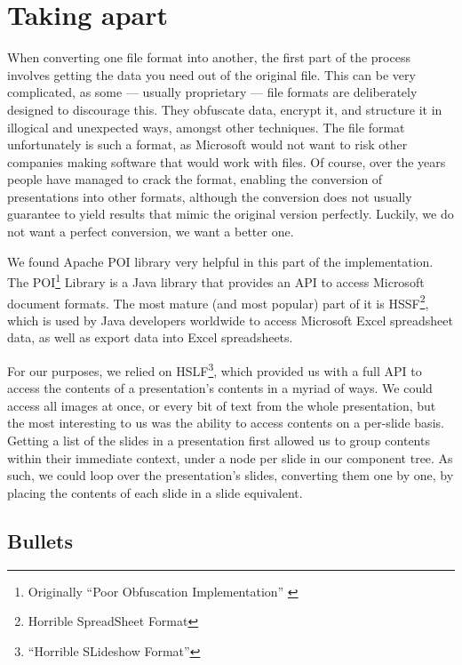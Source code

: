   \section{Taking \ppt apart}
   \label{poi}

   When converting one file format into another, the first part of the process
   involves getting the data you need out of the original file. This can be
   very complicated, as some --- usually proprietary --- file formats are
   deliberately designed to discourage this. They obfuscate data, encrypt it,
   and structure it in illogical and unexpected ways, amongst other techniques.
   The \ppt file format unfortunately is such a format, as Microsoft would not
   want to risk other companies making software that would work with \ppt
   files. Of course, over the years people have managed to crack the format,
   enabling the conversion of \ppt presentations into other formats, although
   the conversion does not usually guarantee to yield results that mimic the
   original version perfectly. Luckily, we do not want a perfect conversion, we
   want a better one.

   We found Apache POI library very helpful in this part of the implementation.
   The POI\footnote{Originally ``Poor Obfuscation Implementation''
   \citep{sundaram-1}} Library is a Java library that provides an API to access
   Microsoft document formats. The most mature (and most popular) part of it is
   HSSF\footnote{Horrible SpreadSheet Format}, which is used by Java developers
   worldwide to access Microsoft Excel spreadsheet data, as well as export data
   into Excel spreadsheets.

   For our purposes, we relied on HSLF\footnote{``Horrible SLideshow Format''},
   which provided us with a full API to access the contents of a \ppt
   presentation's contents in a myriad of ways. We could access all images at
   once, or every bit of text from the whole presentation, but the most
   interesting to us was the ability to access contents on a per-slide basis.
   Getting a list of the slides in a presentation first allowed us to group
   contents within their immediate context, under a node per slide in our
   component tree. As such, we could loop over the presentation's slides,
   converting them one by one, by placing the contents of each slide in a \mxp
   slide equivalent.

   \subsection{Bullets}

